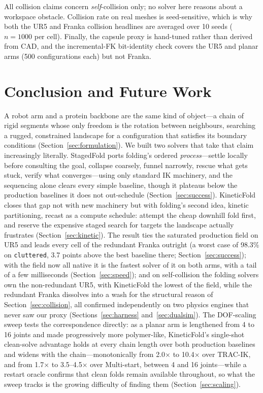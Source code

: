 \documentclass[10pt,conference]{IEEEtran}
\begin{document}
All collision claims concern \emph{self}-collision only; no solver here reasons
about a workspace obstacle. Collision rate on real meshes is seed-sensitive,
which is why both the UR5 and Franka collision headlines are averaged over 10
seeds ($n = 1000$ per cell). Finally, the capsule proxy is hand-tuned rather than
derived from CAD, and the incremental-FK bit-identity check covers the UR5 and
planar arms (500 configurations each) but not Franka.

\section{Conclusion and Future Work}
\label{sec:conclusion}

A robot arm and a protein backbone are the same kind of object---a chain of rigid
segments whose only freedom is the rotation between neighbours, searching a
rugged, constrained landscape for a configuration that satisfies its boundary
conditions (Section~\ref{sec:formulation}). We built two solvers that take that
claim increasingly literally. StagedFold ports folding's ordered
\emph{process}---settle locally before consulting the goal, collapse coarsely,
funnel narrowly, rescue what gets stuck, verify what converges---using only
standard IK machinery, and the sequencing alone clears every simple baseline,
though it plateaus below the production baselines it does not out-schedule
(Section~\ref{sec:success}). KineticFold closes that gap not with new machinery
but with folding's second idea, kinetic partitioning, recast as a compute
schedule: attempt the cheap downhill fold first, and reserve the expensive staged
search for targets the landscape actually frustrates
(Section~\ref{sec:kinetic}). The result ties the saturated production field on
UR5 and leads every cell of the redundant Franka outright (a worst case of
98.3\% on \texttt{cluttered}, 3.7 points above the best baseline there;
Section~\ref{sec:success}); with the field now all native it is the fastest
solver of it on both arms, with a tail of a few milliseconds
(Section~\ref{sec:speed}); and on self-collision the folding solvers own the
non-redundant UR5, with KineticFold the lowest of the field, while the redundant
Franka dissolves into a wash for the structural reason of
Section~\ref{sec:collision}, all confirmed independently on two physics engines
that never saw our proxy (Sections~\ref{sec:harness} and~\ref{sec:dualsim}). The
DOF-scaling sweep tests the correspondence directly: as a planar arm is
lengthened from 4 to 16 joints and made progressively more polymer-like,
KineticFold's single-shot clean-solve advantage holds at every chain length over
both production baselines and widens with the chain---monotonically from
2.0$\times$ to 10.4$\times$ over TRAC-IK, and from 1.7$\times$ to
3.5--4.5$\times$ over Multi-start, between 4 and 16
joints---while a restart oracle confirms that clean folds remain
available throughout, so what the sweep tracks is the growing difficulty of
finding them (Section~\ref{sec:scaling}).
\end{document}
